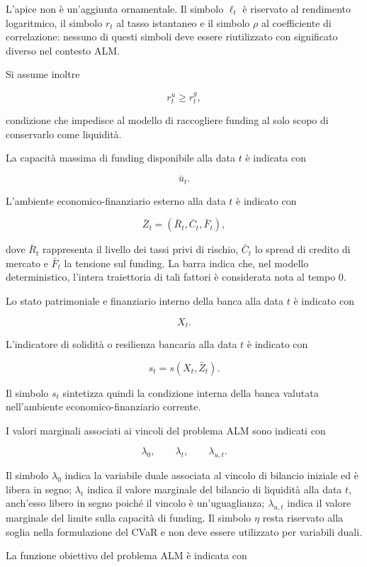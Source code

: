 \documentclass[12pt,a4paper]{article}
\newcommand{\1}{\mathbf{1}}
\begin{document}
L'apice non \`e un'aggiunta ornamentale. Il simbolo $\ell_t$ \`e
riservato al rendimento logaritmico, il simbolo $r_t$ al tasso istantaneo
e il simbolo $\rho$ al coefficiente di correlazione: nessuno di questi
simboli deve essere riutilizzato con significato diverso nel contesto ALM.

Si assume inoltre

\[
r_t^{u}\geq r_t^{g},
\]

condizione che impedisce al modello di raccogliere funding al solo scopo di
conservarlo come liquidit\`a.

La capacit\`a massima di funding disponibile alla data $t$ \`e indicata con

\[
\bar u_t.
\]

L'ambiente economico-finanziario esterno alla data $t$ \`e indicato con

\[
\bar Z_t
=
(\bar R_t,\bar C_t,\bar F_t),
\]

\noindent dove $\bar R_t$ rappresenta il livello dei tassi privi di rischio,
$\bar C_t$ lo spread di credito di mercato e $\bar F_t$ la tensione sul
funding. La barra indica che, nel modello deterministico, l'intera
traiettoria di tali fattori \`e considerata nota al tempo $0$.

Lo stato patrimoniale e finanziario interno della banca alla data $t$ \`e
indicato con

\[
X_t.
\]

L'indicatore di solidit\`a o resilienza bancaria alla data $t$ \`e
indicato con

\[
s_t
=
s(X_t,\bar Z_t).
\]

Il simbolo $s_t$ sintetizza quindi la condizione interna della banca
valutata nell'ambiente economico-finanziario corrente.

I valori marginali associati ai vincoli del problema ALM sono indicati con

\[
\lambda_0,
\qquad
\lambda_t,
\qquad
\lambda_{u,t}.
\]

Il simbolo $\lambda_0$ indica la variabile duale associata al vincolo di
bilancio iniziale ed \`e libera in segno; $\lambda_t$ indica il valore
marginale del bilancio di liquidit\`a alla data $t$, anch'esso libero in
segno poich\'e il vincolo \`e un'uguaglianza; $\lambda_{u,t}$ indica il
valore marginale del limite sulla capacit\`a di funding. Il simbolo $\eta$
resta riservato alla soglia nella formulazione del CVaR e non deve essere
utilizzato per variabili duali.

La funzione obiettivo del problema ALM \`e indicata con
\end{document}
